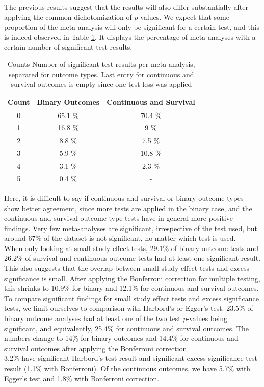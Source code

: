 The previous results suggest that the results will also differ substantially after applying the common dichotomization of $p$-values. We expect that some proportion of the meta-analysis will only be significant for a certain test, and this is indeed observed in Table \ref{number.sig.tests}. It displays the percentage of meta-analyses with a certain number of significant test results.

\begin{table}[ht]
\centering
\begingroup\footnotesize
\begin{tabular}{ccc}
  \hline
Count & Binary Outcomes & Continuous and Survival \\ 
  \hline
0 & 65.1 \% & 70.4 \% \\ 
  1 & 16.8 \% & 9 \% \\ 
  2 & 8.8 \% & 7.5 \% \\ 
  3 & 5.9 \% & 10.8 \% \\ 
  4 & 3.1 \% & 2.3 \% \\ 
  5 & 0.4 \% & - \\ 
   \hline
\end{tabular}
\endgroup
\caption{Counts Number of significant test results per meta-analysis, separated
       for outcome types. Last entry for continuous and survival outcomes is empty since one test less was 
       applied} 
\label{number.sig.tests}
\end{table}


Here, it is difficult to say if continuous and survival or binary outcome types show better agreement, since more tests are applied in the binary case, and the continuous and survival outcome type tests have in general more positive findings. Very few meta-analyses are significant, irrespective of the test used, but around 67\% of the dataset is not significant, no matter which test is used. \\
When only looking at small study effect tests, 29.1\% of binary outcome tests and 26.2\% of survival and continuous outcome tests had at least one significant result. This also suggests that the overlap between small study effect tests and excess significance is small. After applying the Bonferroni correction for multiple testing, this shrinks to 10.9\% for binary and 12.1\% for continuous and survival outcomes. \\
To compare significant findings for small study effect tests and excess significance tests, we limit ourselves to comparison with Harbord's or Egger's test. 23.5\% of binary outcome analyses had at least one of the two test $p$-values being significant, and equivalently, 25.4\% for continuous and survival outcomes. The numbers change to 14\% for binary outcomes and 14.4\% for continuous and survival outcomes after applying the Bonferroni correction. \\
3.2\% have significant Harbord's test result and significant excess significance test result  (1.1\% with Bonferroni). Of the continuous outcomes, we have 5.7\% with Egger's test and 1.8\% with Bonferroni correction. 

